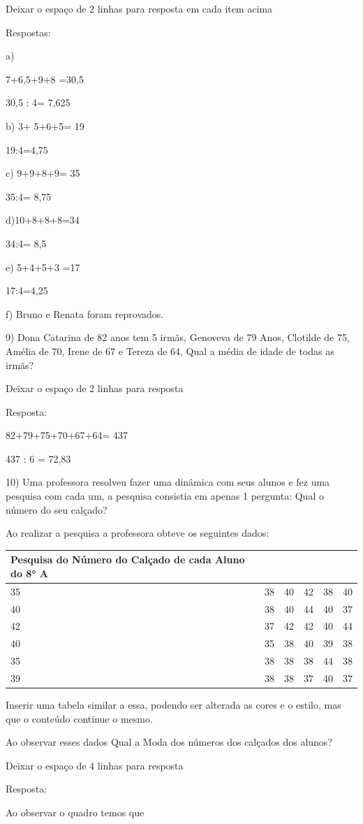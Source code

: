 Deixar o espaço de 2 linhas para resposta em cada item acima

Respostas:

a)

7+6,5+9+8 =30,5

30,5 : 4= 7,625

b) 3+ 5+6+5= 19

19:4=4,75

c) 9+9+8+9= 35

35:4= 8,75

d)10+8+8+8=34

34:4= 8,5

e) 5+4+5+3 =17

17:4=4,25

f) Bruno e Renata foram reprovados.

9) Dona Catarina de 82 anos tem 5 irmãs, Genoveva de 79 Anos, Clotilde
de 75, Amélia de 70, Irene de 67 e Tereza de 64, Qual a média de idade
de todas as irmãs?

Deixar o espaço de 2 linhas para resposta

Resposta:

82+79+75+70+67+64= 437

437 : 6 = 72,83

10) Uma professora resolveu fazer uma dinâmica com seus alunos e fez uma
pesquisa com cada um, a pesquisa consistia em apenas 1 pergunta: Qual o
número do seu calçado?

Ao realizar a pesquisa a professora obteve os seguintes dados:

\begin{longtable}[]{@{}llllll@{}}
\toprule
Pesquisa do Número do Calçado de cada Aluno do 8° A & & & &
&\tabularnewline
\midrule
\endhead
35 & 38 & 40 & 42 & 38 & 40\tabularnewline
40 & 38 & 40 & 44 & 40 & 37\tabularnewline
42 & 37 & 42 & 42 & 40 & 44\tabularnewline
40 & 35 & 38 & 40 & 39 & 38\tabularnewline
35 & 38 & 38 & 38 & 44 & 38\tabularnewline
39 & 38 & 38 & 37 & 40 & 37\tabularnewline
\bottomrule
\end{longtable}

Inserir uma tabela similar a essa, podendo ser alterada as cores e o
estilo, mas que o conteúdo continue o mesmo.

Ao observar esses dados Qual a Moda dos números dos calçados dos alunos?

Deixar o espaço de 4 linhas para resposta

Resposta:

Ao observar o quadro temos que

